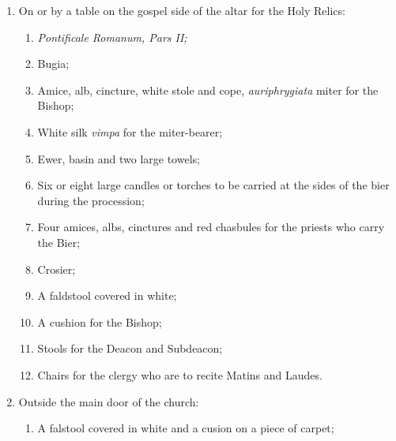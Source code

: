 \documentclass[letterpaper]{report}
\begin{document}
{\begin{enumerate}[label=\Roman*.]
        \item On or by a table on the gospel side of the altar for the Holy
            Relics:

            \begin{enumerate}[label=\arabic*.]

                \item \textit{Pontificale Romanum, Pars II;}

                \item Bugia;

                \item Amice, alb, cincture, white stole and cope,
                    \textit{auriphrygiata} miter for the Bishop;

                \item White silk \textit{vimpa} for the miter-bearer;

                \item Ewer, basin and two large towels;

                \item Six or eight large candles or torches to be carried at
                    the sides of the bier during the procession;

                \item Four amices, albs, cinctures and red chasbules for the
                    priests who carry the Bier;

                \item Crosier;

                \item A faldstool covered in white;

                \item A cushion for the Bishop;

                \item Stools for the Deacon and Subdeacon;

                \item Chairs for the clergy who are to recite Matins and
                    Laudes.

            \end{enumerate}

        \item Outside the main door of the church:

            \begin{enumerate}[label=\arabic*.]
                
                \item A falstool covered in white and a cusion on a piece of
                    carpet;


\end{enumerate}
\end{enumerate}}
\end{document}
